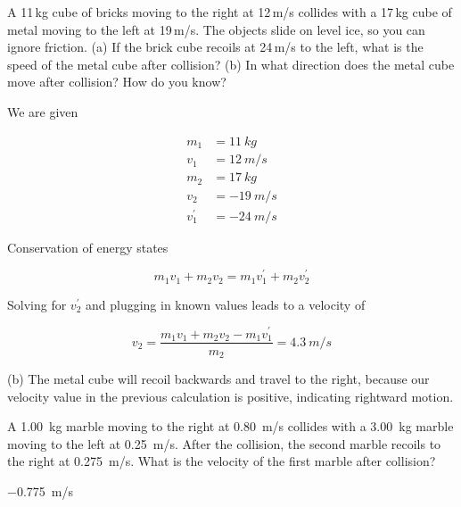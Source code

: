 \documentclass[]{exam}
\begin{document}
\begin{questions}
\question
A 11\,kg cube of bricks moving to the right at 12\,m/s collides with a 17\,kg cube of metal moving to the left at 19\,m/s. The objects slide on level ice, so you can ignore friction. (a) If the brick cube recoils at 24\,m/s to the left, what is the speed of the metal cube after collision? (b) In what direction does the metal cube move after collision? How do you know?


\begin{solution}
We are given 

\vspace{-1em}
\begin{align*}
    m_1 &= \SI{11}{kg} \\[1ex]
    v_1 &= \SI{12}{m/s} \\[1ex]
    m_2 &= \SI{17}{kg} \\[1ex]
    v_2 &= \SI{-19}{m/s} \\[1ex]
    v_1^{\prime} &= \SI{-24}{m/s}
\end{align*}

Conservation of energy states

\begin{equation*}
    m_1v_1 + m_2 v_2 = m_1 v_1^{\prime} + m_2 v_2^{\prime}
\end{equation*}

Solving for $v_2^{\prime}$ and plugging in known values leads to a velocity of

\begin{equation*}
    v_2 = \frac{m_1 v_1 + m_2 v_2 - m_1 v_1^{\prime}}{m_2} = \boxed{\SI{4.3}{m/s}}
\end{equation*}

(b) The metal cube will recoil backwards and travel to the right, because our velocity value in the previous calculation is positive, indicating rightward motion.
\end{solution}

\question
A \SI{1.00}{kg} marble moving to the right at \SI{0.80}{m/s} collides with a \SI{3.00}{kg} marble moving to the left at \SI{0.25}{m/s}. After the collision, the second marble recoils to the right at \SI{0.275}{m/s}. What is the velocity of the first marble after collision? 

\begin{solution}
    \SI{-0.775}{m/s}
\end{solution}


\end{questions}
\end{document}
